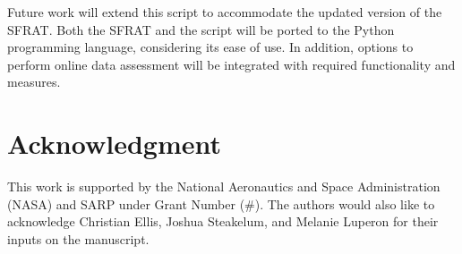 \documentclass[conference]{IEEEtran}
\begin{document}
Future work will extend this script to accommodate the updated version of the SFRAT. Both the SFRAT and the script will be ported to the Python programming language, considering its ease of use. In addition, options to perform online data assessment will be integrated with required functionality and measures.


\section*{Acknowledgment}\label{sec:Ack}
This work is supported by the National Aeronautics and Space Administration (NASA) and SARP under Grant Number (\#). The authors would also like to acknowledge Christian Ellis, Joshua Steakelum, and Melanie Luperon for their inputs on the manuscript.




\end{document}
